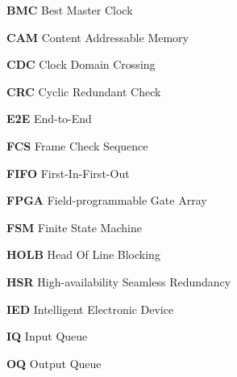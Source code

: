 \textbf{BMC} \hspace{1cm} Best Master Clock \par
\textbf{CAM} \hspace{1cm} Content Addressable Memory \par 
\textbf{CDC} \hspace{1.05cm} Clock Domain Crossing \par
\textbf{CRC} \hspace{1.05cm} Cyclic Redundant Check \par
\textbf{E2E} \hspace{1.15cm} End-to-End \par
\textbf{FCS} \hspace{1.1cm} Frame Check Sequence \par
\textbf{FIFO} \hspace{1.0cm} First-In-First-Out \par
\textbf{FPGA} \hspace{0.83cm} Field-programmable Gate Array \par
\textbf{FSM} \hspace{1.05cm} Finite State Machine \par
\textbf{HOLB} \hspace{0.8cm} Head Of Line Blocking \par
\textbf{HSR} \hspace{1.05cm} High-availability Seamless Redundancy \par
    \iffalse
    \textbf{HMI} \hspace{1.15cm} Human Machine Interface \par
    \fi
\textbf{IED} \hspace{1.2cm} Intelligent Electronic Device \par
\textbf{IQ} \hspace{1.43cm} Input Queue \par
    \iffalse
    \textbf{LLC} \hspace{1.15cm} Logical Link Control \par
    \textbf{MAC} \hspace{1.05cm} Media Access Control \par
    \textbf{MU} \hspace{1.31cm} Merging Unit \par
    \textbf{OSI} \hspace{1.25cm} Open Systems Interconnection \par
    \fi
\textbf{OQ} \hspace{1.31cm} Output Queue \par
